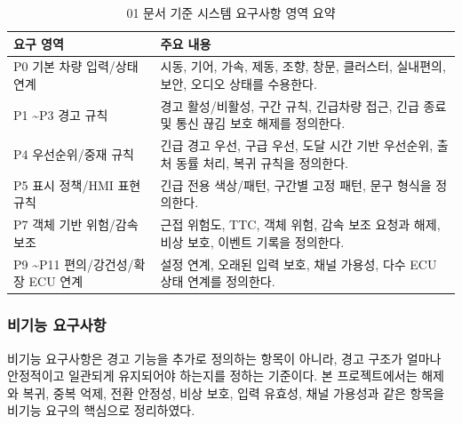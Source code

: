 \documentclass[11pt,a4paper]{article}
\begin{document}
\begin{table}[H]
\centering
\begin{tabularx}{\textwidth}{|p{34mm}|X|}
\hline
\textbf{요구 영역} & \textbf{주요 내용} \\ \hline
P0 기본 차량 입력/상태 연계 & 시동, 기어, 가속, 제동, 조향, 창문, 클러스터, 실내편의, 보안, 오디오 상태를 수용한다. \\ \hline
P1 \textasciitilde P3 경고 규칙 & 경고 활성/비활성, 구간 규칙, 긴급차량 접근, 긴급 종료 및 통신 끊김 보호 해제를 정의한다. \\ \hline
P4 우선순위/중재 규칙 & 긴급 경고 우선, 구급 우선, 도달 시간 기반 우선순위, 출처 동률 처리, 복귀 규칙을 정의한다. \\ \hline
P5 표시 정책/HMI 표현 규칙 & 긴급 전용 색상/패턴, 구간별 고정 패턴, 문구 형식을 정의한다. \\ \hline
P7 객체 기반 위험/감속 보조 & 근접 위험도, TTC, 객체 위험, 감속 보조 요청과 해제, 비상 보호, 이벤트 기록을 정의한다. \\ \hline
P9 \textasciitilde P11 편의/강건성/확장 ECU 연계 & 설정 연계, 오래된 입력 보호, 채널 가용성, 다수 ECU 상태 연계를 정의한다. \\ \hline
\end{tabularx}
\caption{01 문서 기준 시스템 요구사항 영역 요약}
\end{table}

\subsubsection{비기능 요구사항}
비기능 요구사항은 경고 기능을 추가로 정의하는 항목이 아니라, 경고 구조가 얼마나 안정적이고 일관되게 유지되어야 하는지를 정하는 기준이다. 본 프로젝트에서는 해제와 복귀, 중복 억제, 전환 안정성, 비상 보호, 입력 유효성, 채널 가용성과 같은 항목을 비기능 요구의 핵심으로 정리하였다.
\end{document}
